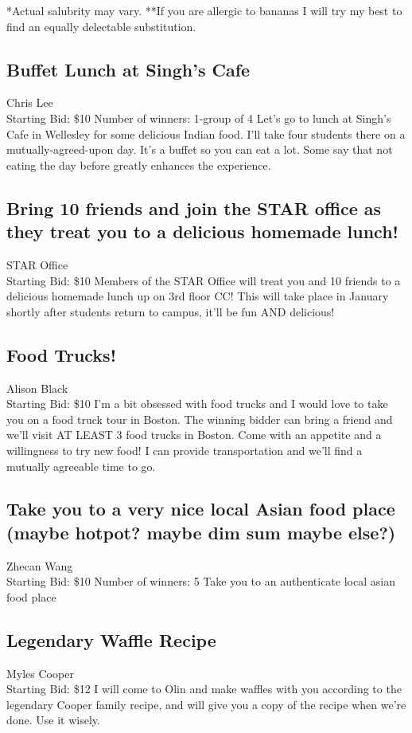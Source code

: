 \documentclass[11pt]{article}
\begin{document}
*Actual salubrity may vary.
**If you are allergic to bananas I will try my best to find an equally delectable substitution.
\subsection{Buffet Lunch at Singh's Cafe }
Chris Lee
\\
Starting Bid: \$10
\newline
Number of winners: 1-group of 4 
\newline
Let's go to lunch at Singh's Cafe in Wellesley for some delicious Indian food.  I'll take four students there on a mutually-agreed-upon day. It's a buffet so you can eat a lot. Some say that not  eating the day before greatly enhances the experience.
\subsection{Bring 10 friends and join the STAR office as they treat you to a delicious homemade lunch!    }
STAR Office
\\
Starting Bid: \$10
\newline
Members of the STAR Office will treat you and 10 friends to a delicious homemade lunch up on 3rd floor CC!  This will take place in January shortly after students return to campus, it'll be fun AND delicious!
\subsection{Food Trucks!}
Alison Black
\\
Starting Bid: \$10
\newline
I'm a bit obsessed with food trucks and I would love to take you on a food truck tour in Boston.  The winning bidder can bring a friend and we'll visit AT LEAST 3 food trucks in Boston.  Come with an appetite and a willingness to try new food!  I can provide transportation and we'll find a mutually agreeable time to go.
\subsection{Take you to a very nice local Asian food place (maybe hotpot? maybe dim sum maybe else?)}
Zhecan Wang
\\
Starting Bid: \$10
\newline
Number of winners: 5
\newline
Take you to an authenticate local asian food place
\subsection{Legendary Waffle Recipe}
Myles Cooper
\\
Starting Bid: \$12
\newline
I will come to Olin and make waffles with you according to the legendary Cooper family recipe, and will give you a copy of the recipe when we're done. Use it wisely.
\end{document}
